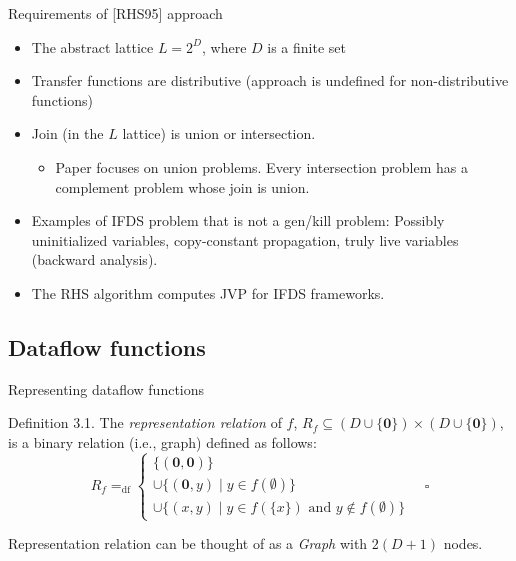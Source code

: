 \begin{frame}{Requirements of [RHS95] approach}
  \begin{itemize}
    \item The abstract lattice $L = 2^D$, where $D$ is a finite set
    \item Transfer functions are distributive (approach is undefined for non-distributive functions)
    \item Join (in the $L$ lattice) is union or intersection.
    \begin{itemize}
      \item Paper focuses on union problems. Every intersection problem has a complement problem whose join is union.
    \end{itemize}
    \item Examples of IFDS problem that is not a gen/kill problem: Possibly uninitialized variables, copy-constant propagation, truly live variables (backward analysis).
    \item The RHS algorithm computes JVP for IFDS frameworks.
  \end{itemize}
\end{frame}

\subsection{Dataflow functions}
\begin{frame}{Representing dataflow functions}
  \begin{block}{Definition 3.1.}
    The \emph{representation relation} of $f$, $R_f \subseteq (D \cup \{\mathbf{0}\}) \times (D \cup \{\mathbf{0}\})$, is a binary relation (i.e., graph) defined as follows:
    $$R_f =_{\text{df}} \left\{ \begin{array}{l}
      \{(\mathbf{0}, \mathbf{0})\} \\
      \cup \{(\mathbf{0}, y) \mid y \in f(\emptyset)\} \\
      \cup \{(x, y) \mid y \in f(\{x\}) \text{ and } y \notin f(\emptyset)\}
    \end{array}\right. \quad \square$$
  \end{block}

  \vspace{0.5em}
  Representation relation can be thought of as a \emph{Graph} with $2(D + 1)$ nodes.
\end{frame}

